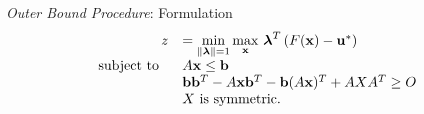 \bigskip
\bigskip
\textit{Outer Bound Procedure}: Formulation
\begin{equation}\label{eq:OPTfeasOutRelaxa}
\begin{array}{rl}
 \ z &=\min\limits_{\lVert\boldsymbol{\lambda}\rVert=1}\max\limits_{\mathbf{x}} \, \boldsymbol{\lambda}^T\left(F(\mathbf{x})-\mathbf{u}^* \right) \\
 \text{subject to } \ & A\mathbf{x}\leq \mathbf{b} \\
 	&\mathbf{b}\mathbf{b}^T-A\mathbf{x}\mathbf{b}^T-\mathbf{b}(A\mathbf{x})^T+AXA^T\geq O \\
 	&X \text{ is symmetric.}
\end{array}
\end{equation}

\bigskip





